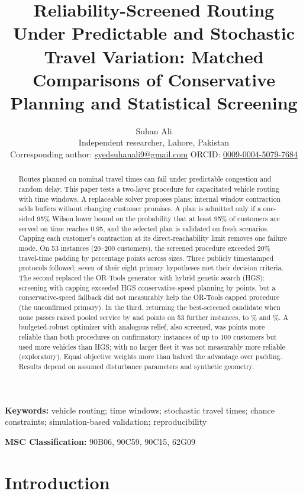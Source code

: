 \documentclass[11pt,a4paper]{article}
\title{Reliability-Screened Routing Under Predictable and Stochastic Travel
Variation: Matched Comparisons of Conservative Planning and Statistical
Screening}
\author{Suhan Ali\\[4pt]
\small Independent researcher, Lahore, Pakistan\\
\small Corresponding author: \href{mailto:syedsuhanali9@gmail.com}{syedsuhanali9@gmail.com}\quad
ORCID: \href{https://orcid.org/0009-0004-5079-7684}{0009-0004-5079-7684}}
\date{}
\begin{document}
\maketitle

\begin{abstract}
Routes planned on nominal travel times can fail under predictable congestion and
random delay. This paper tests a two-layer procedure for capacitated vehicle
routing with time windows. A replaceable solver proposes plans; internal window
contraction adds buffers without changing customer promises. A plan is admitted
only if a one-sided 95\% Wilson lower bound on the probability that at least
95\% of customers are served on time reaches 0.95, and the selected plan is
validated on fresh scenarios. Capping each customer's contraction at its
direct-reachability limit removes one failure mode. On 53 instances (20--200
customers), the screened procedure exceeded 20\% travel-time padding by
\ProcConsRange{} percentage points across sizes. Three publicly timestamped
protocols followed; seven of their eight primary hypotheses met their decision
criteria. The second replaced the OR-Tools generator with hybrid genetic search
(HGS): screening with capping exceeded HGS conservative-speed planning by
\CtwoGOneMean{} points, but a conservative-speed fallback did not measurably
help the OR-Tools capped procedure (the unconfirmed primary). In the third,
returning the best-screened candidate when none passes raised pooled service by
\PbFOne{} and \PbFTwo{} points on 53 further instances, to \PbFThree\% and
\PbFFour\%. A budgeted-robust optimizer with analogous relief, also screened,
was \PaROne{} points more reliable than both procedures on confirmatory
instances of up to 100 customers but used more vehicles than HGS; with no larger
fleet it was not measurably more reliable (exploratory). Equal objective weights
more than halved the advantage over padding. Results depend on assumed
disturbance parameters and synthetic geometry.
\end{abstract}

{\raggedright\noindent\textbf{Keywords:} vehicle routing; time windows;
stochastic travel times; chance constraints; simulation-based validation;
reproducibility\par}

\medskip
\noindent\textbf{MSC Classification:} 90B06, 90C59, 90C15, 62G09

\clearpage

\section{Introduction}
\end{document}
